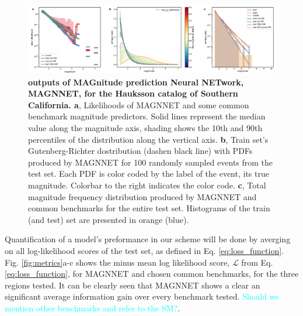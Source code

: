 \documentclass[pdflatex]{sn-jnl}
\newcommand{\neri}[1]{{\textcolor{cyan}{#1}}}
\begin{document}
\begin{figure}[h!]
    \centering
    \includegraphics[width=1\textwidth]{figures/raw_results_hauksson.pdf}
    \caption{
        \textbf{outputs of MAGnitude prediction Neural NETwork, MAGNNET, for the Hauksson catalog of Southern California. a}, Likelihoods of MAGNNET and some common benchmark magnitude predictors. Solid lines represent the median value along the magnitude axis, shading shows the 10th and 90th percentiles of the distribution along the vertical axis. \textbf{b}, Train set's Gutenberg-Richter dostribution (dashen black line) with PDFs produced by MAGNNET for 100 randomly sampled events from the test set. Each PDF is color coded by the label of the event, its true magnitude. Colorbar to the right indicates the color code. \textbf{c}, Total magnitude frequency distribution produced by MAGNNET and common benchmarks for the entire test set. Histograms of the train (and test) set are presented in orange (blue).
    }
    \label{fig:model_output}
\end{figure}


Quantification of a model's preformance in our scheme will be done by averging on all log-likelihood scores of the test set, as defined in Eq. \ref{eq:loss_function}. Fig. \ref{fig:metrics}a-c shows the minus mean log likelihood score, $\mathcal{L}$ from Eq. \ref{eq:loss_function}, for MAGNNET and chosen common benchmarks, for the three regions tested. It can be clearly seen that MAGNNET shows a clear an significant average information gain over every benchmark tested. \neri{Should we mention other benchmarks and refer to the SM?}. 
\end{document}
